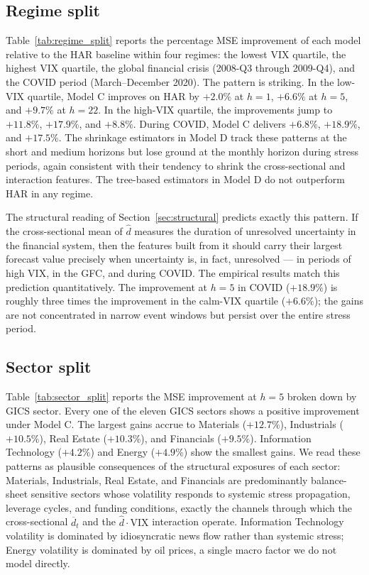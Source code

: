 \documentclass[11pt,a4paper]{article}
\newcommand{\VIX}{\mathrm{VIX}}
\newcommand{\dhat}{\hat d}
\begin{document}


\subsection{Regime split}

Table~\ref{tab:regime_split} reports the percentage MSE improvement of
each model relative to the HAR baseline within four regimes: the lowest
VIX quartile, the highest VIX quartile, the global financial crisis
(2008-Q3 through 2009-Q4), and the COVID period (March--December 2020).
The pattern is striking. In the low-VIX quartile, Model C improves on
HAR by $+2.0\%$ at $h=1$, $+6.6\%$ at $h=5$, and $+9.7\%$ at $h=22$.
In the high-VIX quartile, the improvements jump to $+11.8\%$, $+17.9\%$,
and $+8.8\%$. During COVID, Model C delivers $+6.8\%$, $+18.9\%$, and
$+17.5\%$. The shrinkage estimators in Model D track these patterns at
the short and medium horizons but lose ground at the monthly horizon
during stress periods, again consistent with their tendency to shrink
the cross-sectional and interaction features. The tree-based estimators
in Model D do not outperform HAR in any regime.



The structural reading of Section~\ref{sec:structural} predicts exactly
this pattern. If the cross-sectional mean of $\dhat$ measures the
duration of unresolved uncertainty in the financial system, then the
features built from it should carry their largest forecast value
precisely when uncertainty is, in fact, unresolved --- in periods of
high VIX, in the GFC, and during COVID. The empirical results match
this prediction quantitatively. The improvement at $h=5$ in COVID
($+18.9\%$) is roughly three times the improvement in the calm-VIX
quartile ($+6.6\%$); the gains are not concentrated in narrow event
windows but persist over the entire stress period.

\subsection{Sector split}

Table~\ref{tab:sector_split} reports the MSE improvement at $h=5$ broken
down by GICS sector. Every one of the eleven GICS sectors shows a
positive improvement under Model C. The largest gains accrue to
Materials ($+12.7\%$), Industrials ($+10.5\%$), Real Estate
($+10.3\%$), and Financials ($+9.5\%$). Information Technology
($+4.2\%$) and Energy ($+4.9\%$) show the smallest gains. We read these
patterns as plausible consequences of the structural exposures of each
sector: Materials, Industrials, Real Estate, and Financials are
predominantly balance-sheet sensitive sectors whose volatility responds
to systemic stress propagation, leverage cycles, and funding
conditions, exactly the channels through which the cross-sectional
$\overline d_t$ and the $\dhat\cdot\VIX$ interaction operate.
Information Technology volatility is dominated by idiosyncratic news
flow rather than systemic stress; Energy volatility is dominated by
oil prices, a single macro factor we do not model directly.
\end{document}
